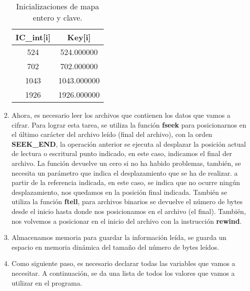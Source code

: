 \documentclass[10pt]{IEEEtran}
\begin{document}
\begin{enumerate}
\begin{verbatim}
\end{verbatim}


\begin{table}[H]
\centering
\caption{Inicializaciones de mapa entero y clave.}
\begin{tabular}[c]{|c|c|}
\hline
\hline
IC\_int[i]	&   Key[i]  \\
\hline
\hline
 524 	&  	524.000000	  \\
702	&  	702.000000	\\  
1043	 &    1043.000000	  \\
1926	  &   1926.000000	  \\

\hline
\hline
\end{tabular}
\end{table}


\item Ahora, es necesario leer los archivos que contienen los datos que vamos a cifrar. Para lograr esta tarea, se utiliza la función \textbf{fseek} para posicionarnos en el último carácter del archivo leído (final del archivo), con la orden \textbf{SEEK\_END}, la operación anterior se ejecuta al desplazar la posición actual de lectura o escritural punto indicado, en este caso, indicamos el final der archivo. La función devuelve un cero si no ha habido problemas, también, se necesita un parámetro que indica el desplazamiento que se ha de realizar. a partir de la referencia indicada, en este caso, se indica que no ocurre ningún desplazamiento, nos quedamos en la posición final indicada. También se utiliza la función \textbf{ftell}, para archivos binarios se devuelve el número de bytes desde el  inicio hasta donde nos posicionamos en el archivo (el final). También, nos volvemos a posicionar en el inicio del archivo con la instrucción \textbf{rewind}.

\item Almacenamos memoria para guardar la información leída, se guarda un espacio en memoria dinámica del tamaño del número de bytes leídos. 


\item Como siguiente paso, es necesario declarar todas las variables que vamos a necesitar. A continuación, se da una lista de todos los valores que vamos a utilizar en el programa.



\begin{itemize}


\end{itemize}
\end{enumerate}
\end{document}
